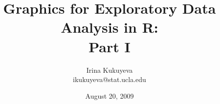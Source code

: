 \title{Graphics for Exploratory Data Analysis in R: \\ Part I}
\author{Irina Kukuyeva \\ \ttfamily ikukuyeva@stat.ucla.edu \normalfont}
\date{August 20, 2009}



\frame{ \titlepage }
